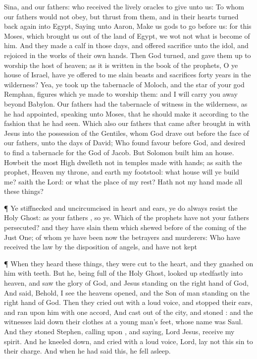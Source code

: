 {Sina,
and
{}
our
fathers:
who
received the
lively
oracles to
give unto
us:
To
whom
our
fathers
would
not
obey,
but
thrust
{} from
them,
and
in
their
hearts turned back
again
into
Egypt,
Saying unto
Aaron,
Make
us
gods
to go
before
us:
for
{}
this
Moses,
which
brought
us
out
of the
land of
Egypt, we
wot
not
what is
become of
him.
And they made a
calf
in
those
days,
and
offered
sacrifice unto the
idol,
and
rejoiced
in the
works of their
own
hands.
Then
God
turned,
and
gave
them
up to
worship the
host of
heaven;
as it is
written
in the
book of the
prophets, O ye
house of
Israel, have ye
offered to
me slain
beasts
and
sacrifices
{}
forty
years
in the
wilderness?
Yea, ye took
up the
tabernacle of
Moloch,
and the
star
of
your
god
Remphan,
figures
which ye
made to
worship
them:
and I will
carry
you
away
beyond
Babylon.
Our
fathers
had the
tabernacle of
witness
in the
wilderness,
as he had
appointed,
speaking unto
Moses, that he should
make
it according
to the
fashion
that he had
seen.
Which
also
our
fathers that came
after brought
in
with
Jesus
into the
possession of the
Gentiles,
whom
God drave
out
before the
face
of
our
fathers,
unto the
days of
David;
Who
found
favour
before
God,
and
desired to
find a
tabernacle for the
God of
Jacob.
But
Solomon
built
him an
house.
Howbeit the most
High
dwelleth
not
in
temples made with
hands;
as
saith the
prophet,
Heaven
{}
my
throne,
and
earth
{}
my
footstool:
what
house will ye
build
me?
saith the
Lord:
or
what
{} the
place
of
my
rest?
Hath
not
my
hand
made
all these
things?
\par }{\PP {}¶
Ye
stiffnecked
and
uncircumcised in
heart
and
ears, ye
do
always
resist
the
Holy
Ghost:
as
your
fathers
{},
so
{}
ye.
Which of the
prophets
have
not
your
fathers
persecuted?
and they have
slain them
which shewed
before
of the
coming of the Just
One; of
whom
ye have
been
now the
betrayers
and
murderers:
Who have
received the
law
by the
disposition of
angels,
and
have
not
kept
{}
\par }{\PP {}¶
When they
heard these
things, they were
cut to the
heart,
and they
gnashed
on
him
with
{}
teeth.
But he,
being
full of
the
Holy
Ghost,
looked
up
stedfastly
into
heaven,
and
saw the
glory of
God,
and
Jesus
standing
on the right
hand of
God,
And
said,
Behold, I
see the
heavens
opened,
and the
Son of
man
standing
on the right
hand of
God.
Then they cried
out with
a
loud
voice, and
stopped
their
ears,
and
ran
upon
him with one
accord,
And
cast
{}
out of the
city,
and
stoned
{}:
and the
witnesses laid
down
their
clothes
at a young
man’s
feet, whose name
was
Saul.
And they
stoned
Stephen, calling
upon
{},
and
saying,
Lord
Jesus,
receive
my
spirit.
And he
kneeled
down,
and
cried with
a
loud
voice,
Lord,
lay
not
this
sin to
their
charge.
And when he had
said
this, he fell
asleep.

}
